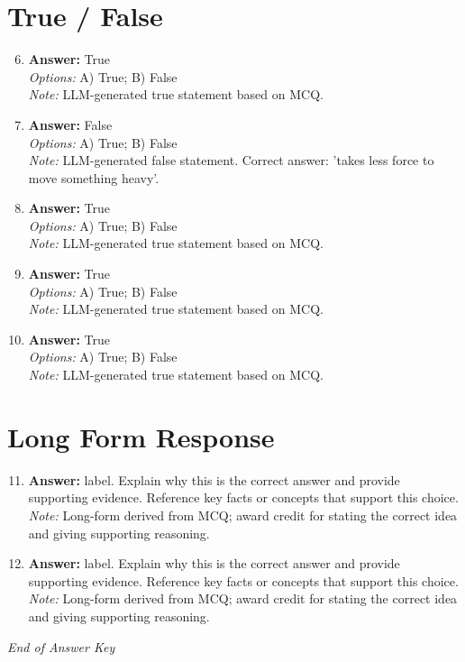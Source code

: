 \documentclass[12pt]{article}
\begin{document}
\section*{True / False}
\begin{enumerate}[label=\arabic*.]
\setcounter{enumi}{5}
\item \textbf{Answer:} True
\\ \textit{Options:} A) True; B) False
\\ \textit{Note:} LLM-generated true statement based on MCQ.
\item \textbf{Answer:} False
\\ \textit{Options:} A) True; B) False
\\ \textit{Note:} LLM-generated false statement. Correct answer: 'takes less force to move something heavy'.
\item \textbf{Answer:} True
\\ \textit{Options:} A) True; B) False
\\ \textit{Note:} LLM-generated true statement based on MCQ.
\item \textbf{Answer:} True
\\ \textit{Options:} A) True; B) False
\\ \textit{Note:} LLM-generated true statement based on MCQ.
\item \textbf{Answer:} True
\\ \textit{Options:} A) True; B) False
\\ \textit{Note:} LLM-generated true statement based on MCQ.
\end{enumerate}

\section*{Long Form Response}
\begin{enumerate}[label=\arabic*.]
\setcounter{enumi}{10}
\item \textbf{Answer:} label. Explain why this is the correct answer and provide supporting evidence. Reference key facts or concepts that support this choice.
\\ \textit{Note:} Long-form derived from MCQ; award credit for stating the correct idea and giving supporting reasoning.
\item \textbf{Answer:} label. Explain why this is the correct answer and provide supporting evidence. Reference key facts or concepts that support this choice.
\\ \textit{Note:} Long-form derived from MCQ; award credit for stating the correct idea and giving supporting reasoning.
\end{enumerate}

\vfill
\noindent\textit{End of Answer Key}
\end{document}
